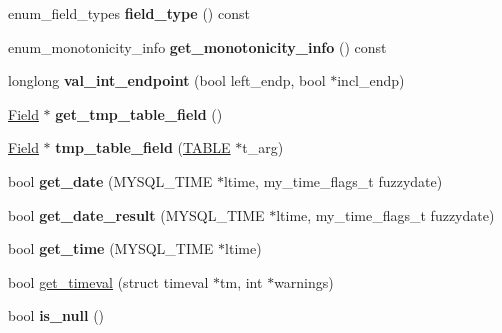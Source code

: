 \begin{DoxyCompactItemize}
enum\+\_\+field\+\_\+types {\bfseries field\+\_\+type} () const
\item 
\mbox{\label{classItem__field_a05c21fd137a1368ea262b46c4ea2d2b6}} 
enum\+\_\+monotonicity\+\_\+info {\bfseries get\+\_\+monotonicity\+\_\+info} () const
\item 
\mbox{\label{classItem__field_ae0ff90462d78a6b0174f7b85b733d12c}} 
longlong {\bfseries val\+\_\+int\+\_\+endpoint} (bool left\+\_\+endp, bool $\ast$incl\+\_\+endp)
\item 
\mbox{\label{classItem__field_a31075175d233e69dd342144c979d21d6}} 
\mbox{\hyperlink{classField}{Field}} $\ast$ {\bfseries get\+\_\+tmp\+\_\+table\+\_\+field} ()
\item 
\mbox{\label{classItem__field_a070650b5412f256ce48c135d454c00fb}} 
\mbox{\hyperlink{classField}{Field}} $\ast$ {\bfseries tmp\+\_\+table\+\_\+field} (\mbox{\hyperlink{structTABLE}{T\+A\+B\+LE}} $\ast$t\+\_\+arg)
\item 
\mbox{\label{classItem__field_a76beab1062cb8289fd6a3da6dd930389}} 
bool {\bfseries get\+\_\+date} (M\+Y\+S\+Q\+L\+\_\+\+T\+I\+ME $\ast$ltime, my\+\_\+time\+\_\+flags\+\_\+t fuzzydate)
\item 
\mbox{\label{classItem__field_a39858ffbc501bfe74dc2ec92d0892b7a}} 
bool {\bfseries get\+\_\+date\+\_\+result} (M\+Y\+S\+Q\+L\+\_\+\+T\+I\+ME $\ast$ltime, my\+\_\+time\+\_\+flags\+\_\+t fuzzydate)
\item 
\mbox{\label{classItem__field_a25e9e3d563574f5ae4c8bd4e05a372a4}} 
bool {\bfseries get\+\_\+time} (M\+Y\+S\+Q\+L\+\_\+\+T\+I\+ME $\ast$ltime)
\item 
bool \mbox{\hyperlink{classItem__field_a1b77cc2e083b73e7f7640a0633be6312}{get\+\_\+timeval}} (struct timeval $\ast$tm, int $\ast$warnings)
\item 
\mbox{\label{classItem__field_a10d6703722ce25ea0eae861a5eb39713}} 
bool {\bfseries is\+\_\+null} ()
\item 
\mbox{\label{classItem__field_ad3a74415e8ac45b7c91e3dc6b28a8ecb}} 

\end{DoxyCompactItemize}
